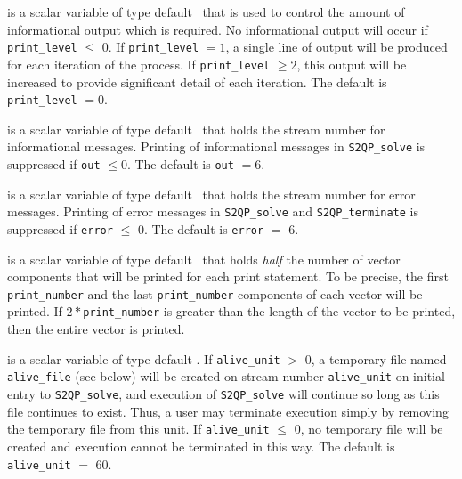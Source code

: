 \documentclass{galahad}
\newcommand{\packagename}{S2QP}
\begin{document}
\begin{description}

 is a scalar variable of type default \integer\ that is used
to control the amount of informational output which is required. No 
informational output will occur if {\tt print\_level} $\leq$ 0. 
If {\tt print\_level} $= 1$, a single line of output will be produced for each
iteration of the process. If {\tt print\_level} $\geq 2$, this output will be
increased to provide significant detail of each iteration.
The default is {\tt print\_level} $= 0$. 

 is a scalar variable of type default \integer\ that holds the
stream number for informational messages.
Printing of informational messages in 
{\tt \packagename\_solve}
is suppressed if {\tt out} $\leq 0$.
The default is {\tt out} $= 6$.

 is a scalar variable of type default \integer\ that holds the
stream number for error messages.
Printing of error messages in 
{\tt \packagename\_solve}
and
{\tt \packagename\_terminate}
is suppressed if {\tt error} $\leq$ 0.
The default is {\tt error} $=$ 6.

 is a scalar variable of type default \integer\
that holds {\em half} the number of vector components that will be
printed for each print statement.  To be precise, the first {\tt
  print\_number} and the last {\tt print\_number} components of each
vector will be printed.  If $2\ast${\tt print\_number} is greater than the
length of the vector to be printed, then the entire vector is printed.

 is a scalar variable of type default \integer.
If {\tt alive\_unit} $>$ 0, a temporary file named {\tt alive\_file} (see below)
will be created on stream number {\tt alive\_unit} on initial entry to 
{\tt \packagename\_solve}, and execution of {\tt \packagename\_solve} will continue so
long as this file continues to exist. Thus, a user may terminate execution
simply by removing the temporary file from this unit.
If {\tt alive\_unit} $\leq$ 0, no temporary file will be created and
execution cannot be terminated in this way.
The default is {\tt alive\_unit} $=$ 60.





\end{description}
\end{document}
